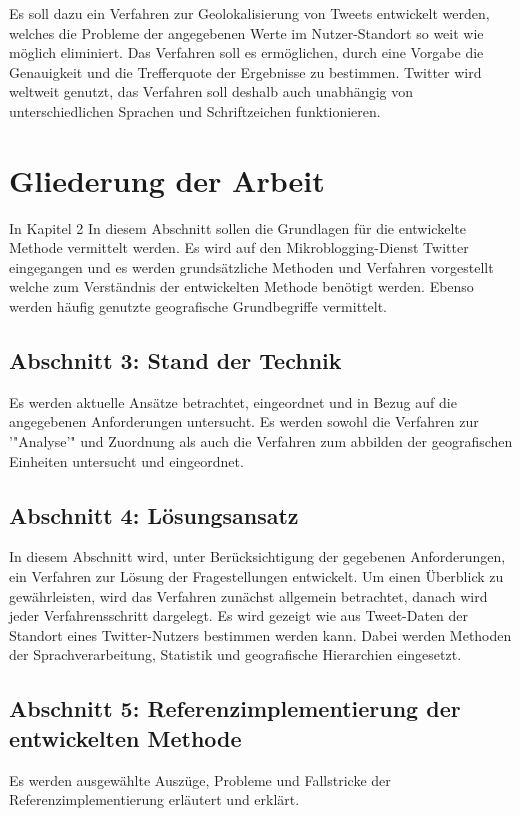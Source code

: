		Es soll dazu ein Verfahren zur Geolokalisierung von Tweets entwickelt werden, welches die Probleme der angegebenen Werte im Nutzer-Standort so weit wie möglich eliminiert.
		Das Verfahren soll es ermöglichen, durch eine Vorgabe die Genauigkeit und die Trefferquote der Ergebnisse zu bestimmen.
		Twitter wird weltweit genutzt, das Verfahren soll deshalb auch unabhängig von unterschiedlichen Sprachen und Schriftzeichen funktionieren.


	\section{Gliederung der Arbeit}

			In Kapitel 2 
			In diesem Abschnitt sollen die Grundlagen für die entwickelte Methode vermittelt werden. 
			Es wird auf den Mikroblogging-Dienst Twitter eingegangen und es werden grundsätzliche Methoden und Verfahren vorgestellt welche zum Verständnis der entwickelten Methode benötigt werden. 
			Ebenso werden häufig genutzte geografische Grundbegriffe vermittelt.

		\subsection*{Abschnitt 3: Stand der Technik}
			Es werden aktuelle Ansätze betrachtet, eingeordnet und in Bezug auf die angegebenen Anforderungen untersucht.
			Es werden sowohl die Verfahren zur '"Analyse'" und Zuordnung als auch die Verfahren zum abbilden der geografischen Einheiten untersucht und eingeordnet. 

		\subsection*{Abschnitt 4: Lösungsansatz}
			In diesem Abschnitt wird, unter Berücksichtigung der gegebenen Anforderungen, ein Verfahren zur Lösung der Fragestellungen entwickelt. 
			Um einen Überblick zu gewährleisten, wird das Verfahren zunächst allgemein betrachtet, danach wird jeder Verfahrensschritt dargelegt.
			Es wird gezeigt wie aus Tweet-Daten der Standort eines Twitter-Nutzers bestimmen werden kann.
			Dabei werden Methoden der Sprachverarbeitung, Statistik und geografische Hierarchien eingesetzt. 

		\subsection*{Abschnitt 5: Referenzimplementierung der entwickelten Methode}
			Es werden ausgewählte Auszüge, Probleme und Fallstricke der Referenzimplementierung erläutert und erklärt. 

